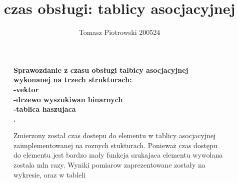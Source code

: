 \documentclass[a4paper,11pt]{report}
\title{czas obsługi: tablicy asocjacyjnej}
\author{Tomasz Piotrowski 200524}
\begin{document}
\maketitle
\begin{figure}
\textbf {\Large{ Sprawozdanie z czasu obsługi talbicy asocjacyjnej wykonanej na trzech strukturach:\\
-vektor\\
-drzewo wyszukiwan binarnych\\
-tablica haszujaca\\
. }}
\end{figure}


\begin{figure}
Zmierzony został czas dostepu do elementu w tablicy asocjacyjnej zaimplementowanej na roznych stukturach. Ponieważ czas dostępu do elementu jest bardzo mały funkcja szukajaca elementu wywolana zostala mln razy. Wyniki pomiarow zaprezentowane zostały na wykresie, oraz w tableli
\end{figure}
\end{document}
